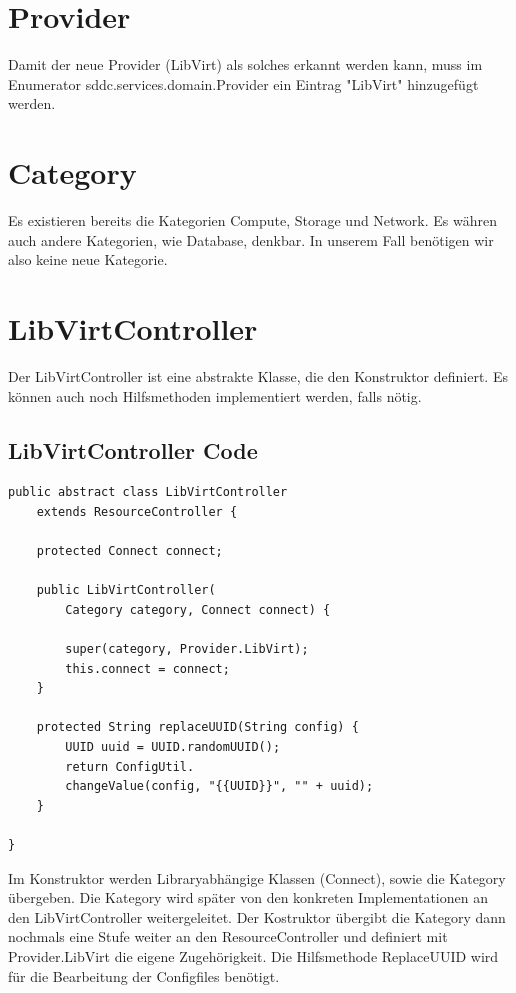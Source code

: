 \documentclass[11pt]{scrartcl}
\begin{document}
\section{Provider}
Damit der neue Provider (LibVirt) als solches erkannt werden kann, muss im Enumerator sddc.services.domain.Provider ein Eintrag "LibVirt" hinzugefügt werden.

\section{Category}
Es existieren bereits die Kategorien Compute, Storage und Network. Es währen auch andere Kategorien, wie Database, denkbar. In unserem Fall benötigen wir also keine neue Kategorie.

\newpage

\section{LibVirtController}
Der LibVirtController ist eine abstrakte Klasse, die den Konstruktor definiert. Es können auch noch Hilfsmethoden implementiert werden, falls nötig.

\subsection{LibVirtController Code}

\begin{lstlisting}[frame=single] 
public abstract class LibVirtController 
	extends ResourceController {
	
	protected Connect connect;
	
	public LibVirtController(
		Category category, Connect connect) {
		
		super(category, Provider.LibVirt);
		this.connect = connect;
	}
	
	protected String replaceUUID(String config) {
		UUID uuid = UUID.randomUUID();
		return ConfigUtil.
		changeValue(config, "{{UUID}}", "" + uuid);
	}

}
\end{lstlisting}
Im Konstruktor werden Libraryabhängige Klassen (Connect), sowie die Kategory übergeben. Die Kategory wird später von den konkreten Implementationen an den LibVirtController weitergeleitet. Der Kostruktor übergibt die Kategory dann nochmals eine Stufe weiter an den ResourceController und definiert mit Provider.LibVirt die eigene Zugehörigkeit.
Die Hilfsmethode ReplaceUUID wird für die Bearbeitung der Configfiles benötigt.
\end{document}
